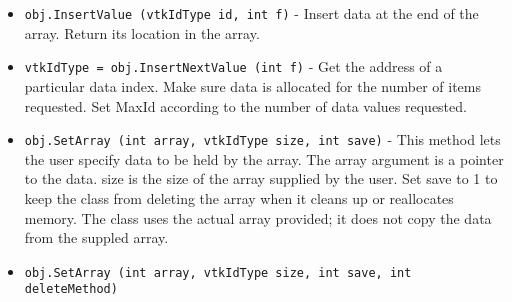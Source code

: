 \begin{itemize}
\item  \verb|obj.InsertValue (vtkIdType id, int f)| -  Insert data at the end of the array. Return its location in the array.

\item  \verb|vtkIdType = obj.InsertNextValue (int f)| -  Get the address of a particular data index. Make sure data is allocated
 for the number of items requested. Set MaxId according to the number of
 data values requested.

\item  \verb|obj.SetArray (int array, vtkIdType size, int save)| -  This method lets the user specify data to be held by the array.  The
 array argument is a pointer to the data.  size is the size of
 the array supplied by the user.  Set save to 1 to keep the class
 from deleting the array when it cleans up or reallocates memory.
 The class uses the actual array provided; it does not copy the data
 from the suppled array. 

\item  \verb|obj.SetArray (int array, vtkIdType size, int save, int deleteMethod)|

\end{itemize}
